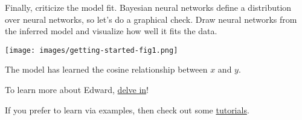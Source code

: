 Finally, criticize the model fit. Bayesian neural networks define a
distribution over neural networks, so let's do a graphical check. Draw
neural networks from the inferred model and visualize how well it
fits the data.

\texttt{[image: images/getting-started-fig1.png]}

The model has learned the cosine relationship between $x$ and $y$.

To learn more about Edward, \href{/api}{delve in}!

If you prefer to learn via examples, then check out some
\href{/tutorials/}{tutorials}.
